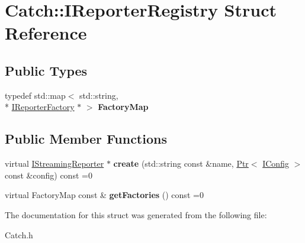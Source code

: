 \hypertarget{struct_catch_1_1_i_reporter_registry}{\section{Catch\-:\-:I\-Reporter\-Registry Struct Reference}
\label{struct_catch_1_1_i_reporter_registry}
}
\subsection*{Public Types}
\begin{DoxyCompactItemize}
\item 
\hypertarget{struct_catch_1_1_i_reporter_registry_a328440adc2303a1e31bdc763f0504452}{typedef std\-::map$<$ std\-::string, \\*
\hyperlink{struct_catch_1_1_i_reporter_factory}{I\-Reporter\-Factory} $\ast$ $>$ {\bfseries Factory\-Map}}\label{struct_catch_1_1_i_reporter_registry_a328440adc2303a1e31bdc763f0504452}

\end{DoxyCompactItemize}
\subsection*{Public Member Functions}
\begin{DoxyCompactItemize}
\item 
\hypertarget{struct_catch_1_1_i_reporter_registry_aa755ff8c6f1d29aaf43e0127c70e85d0}{virtual \hyperlink{struct_catch_1_1_i_streaming_reporter}{I\-Streaming\-Reporter} $\ast$ {\bfseries create} (std\-::string const \&name, \hyperlink{class_catch_1_1_ptr}{Ptr}$<$ \hyperlink{struct_catch_1_1_i_config}{I\-Config} $>$ const \&config) const =0}\label{struct_catch_1_1_i_reporter_registry_aa755ff8c6f1d29aaf43e0127c70e85d0}

\item 
\hypertarget{struct_catch_1_1_i_reporter_registry_a76ffc8a26c38929f370196937ed112b5}{virtual Factory\-Map const \& {\bfseries get\-Factories} () const =0}\label{struct_catch_1_1_i_reporter_registry_a76ffc8a26c38929f370196937ed112b5}

\end{DoxyCompactItemize}


The documentation for this struct was generated from the following file\-:\begin{DoxyCompactItemize}
\item 
Catch.\-h\end{DoxyCompactItemize}
